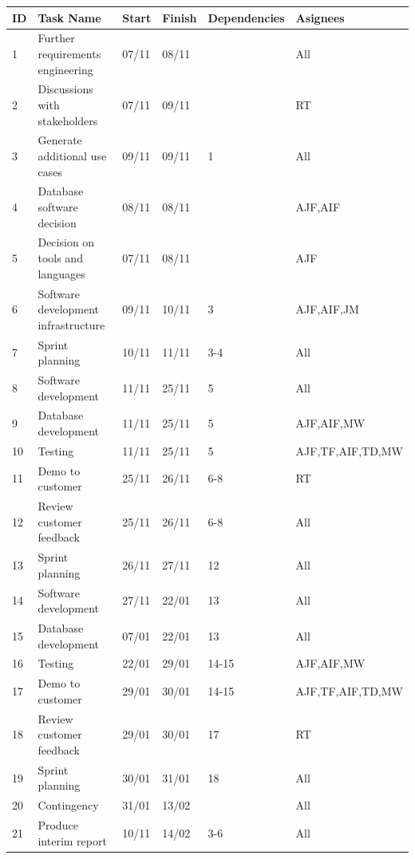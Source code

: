 \begin{table}[H]
\centering
\begin{tabular}{|p{0.6cm}|p{5.7cm}|p{1.1cm}|p{1.1cm}|p{2.4cm}|p{3.3cm}|}
	\hline
	\textbf{ID} & \textbf{Task Name} & \textbf{Start} & \textbf{Finish} & \textbf{Dependencies} & \textbf{Asignees} \\ \hline
	1 & Further requirements engineering & 07/11 & 08/11 &  & All \\ \hline
	2 & Discussions with stakeholders & 07/11 & 09/11 &  & RT \\ \hline
	3 & Generate additional use cases & 09/11 & 09/11 & 1 & All \\ \hline
	4 & Database software decision & 08/11 & 08/11 &  & AJF,AIF \\ \hline
	5 & Decision on tools and languages & 07/11 & 08/11 &  & AJF \\ \hline
	6 & Software development infrastructure & 09/11 & 10/11 & 3 & AJF,AIF,JM \\ \hline
	7 & Sprint planning & 10/11 & 11/11 & 3-4 & All \\ \hline
	8 & Software development & 11/11 & 25/11 & 5 & All \\ \hline
	9 & Database development & 11/11 & 25/11 & 5 & AJF,AIF,MW \\ \hline
	10 & Testing & 11/11 & 25/11 & 5 & AJF,TF,AIF,TD,MW \\ \hline
	11 & Demo to customer & 25/11 & 26/11 & 6-8 & RT \\ \hline
	12 & Review customer feedback & 25/11 & 26/11 & 6-8 & All \\ \hline
	13 & Sprint planning & 26/11 & 27/11 & 12 & All \\ \hline
	14 & Software development & 27/11 & 22/01 & 13 & All \\ \hline
	15 & Database development & 07/01 & 22/01 & 13 & All \\ \hline
	16 & Testing & 22/01 & 29/01 & 14-15 & AJF,AIF,MW \\ \hline
	17 & Demo to customer & 29/01 & 30/01 & 14-15 & AJF,TF,AIF,TD,MW \\ \hline
	18 & Review customer feedback & 29/01 & 30/01 & 17 & RT \\ \hline
	19 & Sprint planning & 30/01 & 31/01 & 18 & All \\ \hline
	20 & Contingency & 31/01 & 13/02 &  & All \\ \hline
	21 & Produce interim report & 10/11 & 14/02 & 3-6 & All \\ \hline
\end{tabular}
\end{table}
